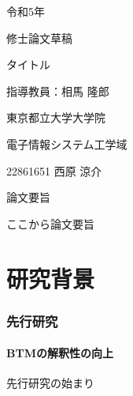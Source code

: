 \documentclass{ltjarticle}
\begin{document}
\begin{titlepage}
    \begin{center}
        {\Large 令和5年}
        \vspace{10truept}

        {\Large 修士論文草稿}
        \vspace*{180truept}

        {\Huge タイトル} 
        \vspace{160truept}

        {\Large 指導教員：相馬 隆郎}
        \vspace{30truept}

        {\Large 東京都立大学大学院}
        \vspace{10truept}

        {\Large 電子情報システム工学域}
        \vspace{30truept}

        {\Large 22861651 西原 涼介}      
    \end{center}
\end{titlepage}
\noindent
{\LARGE 論文要旨}
\vspace{20truept}

ここから論文要旨

\newpage
\tableofcontents
\clearpage

\part{研究背景}
\section{先行研究}
\subsection{BTMの解釈性の向上}
先行研究の始まり
\end{document}
